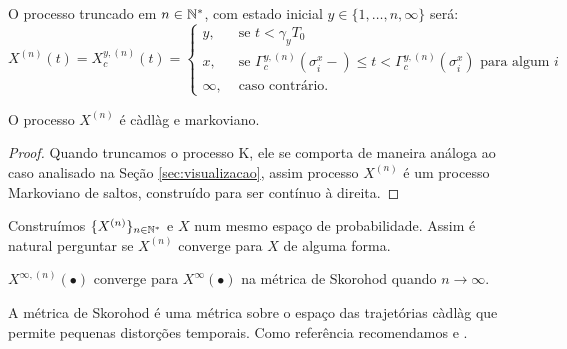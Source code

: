 O processo truncado em $n \in {\mathbb{N^*}}$, com estado inicial $y \in \{1,
\ldots, n, \infty\}$ será:
\begin{displaymath}
  X^{(n)}(t) = X^{y,(n)}_c(t) = \begin{cases}
    y, & \textrm{ se }  t < \gamma_y T_0 \\
    x, & \textrm{ se } \Gamma^{y,(n)}_c(\sigma_i^x-) \leq t <
    \Gamma^{y,(n)}_c(\sigma^x_i)
    \text{ para algum } i \\
    \infty, & \textrm{ caso contrário.}
  \end{cases}
\end{displaymath}

\begin{proposicao}
  O processo $X^{(n)}$ é càdlàg e markoviano.
\end{proposicao}
\begin{proof}
  Quando truncamos o processo K, ele se comporta de maneira análoga ao
  caso analisado na Seção \ref{sec:visualizacao}, assim processo
  $X^{(n)}$ é um processo Markoviano de saltos, construído para ser
  contínuo à direita.
\end{proof}

Construímos $\{X^{(n)}\}_{n \in {\mathbb{N^*}}}$ e $X$ num mesmo
espaço de probabilidade. Assim é natural perguntar se $X^{(n)}$
converge para $X$ de alguma forma.

\begin{teorema}
  \label{teo:convergencia}
  $X^{\infty, (n)} (\bullet)$ converge para $X^\infty(\bullet)$ \qc na
  métrica de Skorohod quando $n \to \infty$.
\end{teorema}

A métrica de Skorohod é uma métrica sobre o espaço das trajetórias
càdlàg que permite pequenas distorções temporais. Como
referência recomendamos \cite{billingsley:99} e \cite{ethier:86}.




